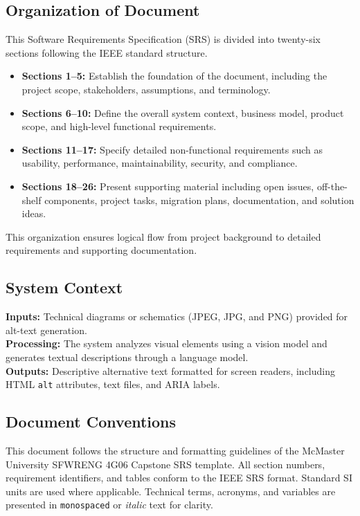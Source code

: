\documentclass[12pt]{article}
\begin{document}
\subsection{Organization of Document}
This Software Requirements Specification (SRS) is divided into twenty-six sections following the IEEE standard structure. 
\begin{itemize}
    \item \textbf{Sections 1–5:} Establish the foundation of the document, including the project scope, stakeholders, assumptions, and terminology.
    \item \textbf{Sections 6–10:} Define the overall system context, business model, product scope, and high-level functional requirements.
    \item \textbf{Sections 11–17:} Specify detailed non-functional requirements such as usability, performance, maintainability, security, and compliance.
    \item \textbf{Sections 18–26:} Present supporting material including open issues, off-the-shelf components, project tasks, migration plans, documentation, and solution ideas.
\end{itemize}
This organization ensures logical flow from project background to detailed requirements and supporting documentation.

\subsection{System Context}

\textbf{Inputs:} Technical diagrams or schematics (JPEG, JPG, and PNG) provided for alt-text generation. \\[2mm]
\textbf{Processing:} The system analyzes visual elements using a vision model and generates textual descriptions through a language model. \\[2mm]
\textbf{Outputs:} Descriptive alternative text formatted for screen readers, including HTML \texttt{alt} attributes, text files, and ARIA labels.

\subsection{Document Conventions}

This document follows the structure and formatting guidelines of the McMaster University SFWRENG 4G06 Capstone SRS template. 
All section numbers, requirement identifiers, and tables conform to the IEEE SRS format. 
Standard SI units are used where applicable. 
Technical terms, acronyms, and variables are presented in \texttt{monospaced} or \textit{italic} text for clarity.
\end{document}
